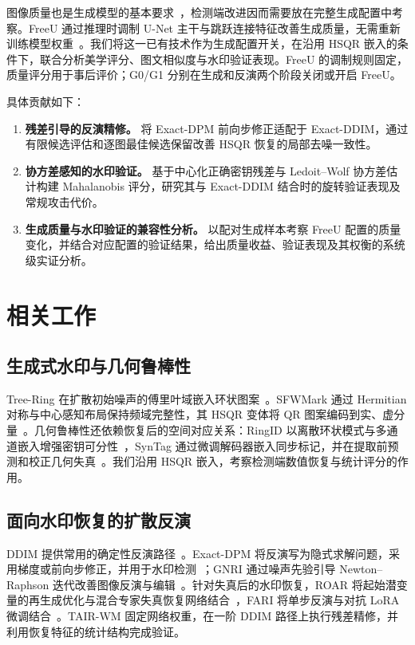 \documentclass[10pt,twocolumn,letterpaper]{article}
\begin{document}
图像质量也是生成模型的基本要求~\cite{ldm2022}，检测端改进因而需要放在完整生成配置中考察。FreeU 通过推理时调制 U-Net 主干与跳跃连接特征改善生成质量，无需重新训练模型权重~\cite{freeu2024}。我们将这一已有技术作为生成配置开关，在沿用 HSQR 嵌入的条件下，联合分析美学评分、图文相似度与水印验证表现。FreeU 的调制规则固定，质量评分用于事后评价；G0/G1 分别在生成和反演两个阶段关闭或开启 FreeU。

具体贡献如下：
\begin{enumerate}[leftmargin=*,itemsep=3pt,topsep=4pt]
\item \textbf{残差引导的反演精修。} 将 Exact-DPM 前向步修正适配于 Exact-DDIM，通过有限候选评估和逐图最佳候选保留改善 HSQR 恢复的局部去噪一致性。
\item \textbf{协方差感知的水印验证。} 基于中心化正确密钥残差与 Ledoit--Wolf 协方差估计构建 Mahalanobis 评分，研究其与 Exact-DDIM 结合时的旋转验证表现及常规攻击代价。
\item \textbf{生成质量与水印验证的兼容性分析。} 以配对生成样本考察 FreeU 配置的质量变化，并结合对应配置的验证结果，给出质量收益、验证表现及其权衡的系统级实证分析。
\end{enumerate}

\section{相关工作}
\subsection{生成式水印与几何鲁棒性}
Tree-Ring 在扩散初始噪声的傅里叶域嵌入环状图案~\cite{treering2023}。SFWMark 通过 Hermitian 对称与中心感知布局保持频域完整性，其 HSQR 变体将 QR 图案编码到实、虚分量~\cite{sfw2025}。几何鲁棒性还依赖恢复后的空间对应关系：RingID 以离散环状模式与多通道嵌入增强密钥可分性~\cite{ringid2024}，SynTag 通过微调解码器嵌入同步标记，并在提取前预测和校正几何失真~\cite{syntag2025}。我们沿用 HSQR 嵌入，考察检测端数值恢复与统计评分的作用。

\subsection{面向水印恢复的扩散反演}
DDIM 提供常用的确定性反演路径~\cite{ddim2021}。Exact-DPM 将反演写为隐式求解问题，采用梯度或前向步修正，并用于水印检测~\cite{exactdpm2024}；GNRI 通过噪声先验引导 Newton--Raphson 迭代改善图像反演与编辑~\cite{gnri2025}。针对失真后的水印恢复，ROAR 将起始潜变量的再生成优化与混合专家失真恢复网络结合~\cite{roar2025}，FARI 将单步反演与对抗 LoRA 微调结合~\cite{fari2026}。TAIR-WM 固定网络权重，在一阶 DDIM 路径上执行残差精修，并利用恢复特征的统计结构完成验证。
\end{document}
